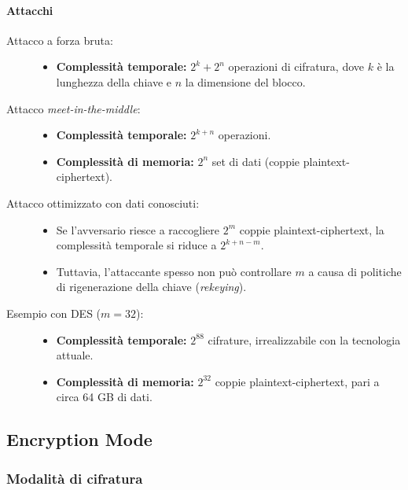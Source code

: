 \documentclass{report}
\begin{document}
\paragraph{Attacchi}
\begin{description}
    \item[Attacco a forza bruta:] 
    \begin{itemize}
        \item \textbf{Complessità temporale:} $2^k + 2^n$ operazioni di cifratura, dove $k$ è la lunghezza della chiave e $n$ la dimensione del blocco.
    \end{itemize}

    \item[Attacco \textit{meet-in-the-middle}:] 
    \begin{itemize}
        \item \textbf{Complessità temporale:} $2^{k+n}$ operazioni.
        \item \textbf{Complessità di memoria:} $2^n$ set di dati (coppie plaintext-ciphertext).
    \end{itemize}

    \item[Attacco ottimizzato con dati conosciuti:] 
    \begin{itemize}
        \item Se l’avversario riesce a raccogliere $2^m$ coppie plaintext-ciphertext, la complessità temporale si riduce a $2^{k+n-m}$.
        \item Tuttavia, l'attaccante spesso non può controllare $m$ a causa di politiche di rigenerazione della chiave (\textit{rekeying}).
    \end{itemize}

    \item[Esempio con DES ($m = 32$):]
    \begin{itemize}
        \item \textbf{Complessità temporale:} $2^{88}$ cifrature, irrealizzabile con la tecnologia attuale.
        \item \textbf{Complessità di memoria:} $2^{32}$ coppie plaintext-ciphertext, pari a circa 64 GB di dati.
    \end{itemize}
\end{description}

\subsection{Encryption Mode}
\subsubsection{Modalità di cifratura}
\end{document}
